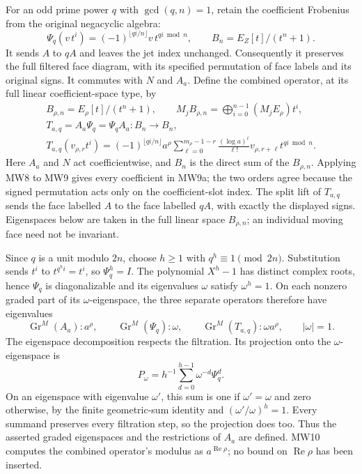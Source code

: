 For an odd prime power \(q\) with \(\gcd(q,n)=1\), retain the coefficient
Frobenius from the original negacyclic algebra:
\[
 \Psi_q(v\,t^i)
   =(-1)^{\lfloor qi/n\rfloor}v\,t^{qi\bmod n},
 \qquad B_n=E_Z[t]/(t^n+1).
 \tag{MW9}
\]
It sends \(A\) to \(qA\) and leaves the jet index unchanged.
Consequently it preserves the full filtered face diagram, with its
specified permutation of face labels and its original signs. It
commutes with \(N\) and \(A_a\). Define the combined operator, at its
full linear coefficient-space type, by
\[
 \begin{gathered}
 B_{\rho,n}=E_\rho[t]/(t^n+1),\qquad
 M_jB_{\rho,n}=\bigoplus_{i=0}^{n-1}(M_jE_\rho)t^i,\\
 T_{a,q}=A_a\Psi_q=\Psi_q A_a:B_n\longrightarrow B_n,\\
 T_{a,q}(v_{\rho,r}t^i)
 =(-1)^{\lfloor qi/n\rfloor}a^\rho
   \sum_{\ell=0}^{m_\rho-1-r}
      \frac{(\log a)^\ell}{\ell!}
      v_{\rho,r+\ell}t^{qi\bmod n}.
 \end{gathered}
 \tag{MW9a}
\]
Here \(A_a\) and \(N\) act coefficientwise, and \(B_n\) is the direct
sum of the \(B_{\rho,n}\). Applying MW8 to MW9 gives every coefficient
in MW9a; the two orders agree because the signed permutation acts only
on the coefficient-slot index. The split lift of \(T_{a,q}\) sends
the face labelled \(A\) to the face labelled \(qA\), with exactly
the displayed signs. Eigenspaces below are taken in the full linear
space \(B_{\rho,n}\); an individual moving face need not be invariant.

Since \(q\) is a unit modulo \(2n\), choose \(h\geq1\) with
\(q^h\equiv1\pmod {2n}\). Substitution sends \(t^i\) to
\(t^{q^hi}=t^i\), so \(\Psi_q^h=I\). The polynomial \(X^h-1\)
has distinct complex roots, hence \(\Psi_q\) is diagonalizable and
its eigenvalues \(\omega\) satisfy \(\omega^h=1\).
On each nonzero graded part of its \(\omega\)-eigenspace, the three
separate operators therefore have eigenvalues
\[
 \operatorname{Gr}^M(A_a):a^\rho,\qquad
 \operatorname{Gr}^M(\Psi_q):\omega,\qquad
 \operatorname{Gr}^M(T_{a,q}):\omega a^\rho,
 \qquad |\omega|=1 .
 \tag{MW10}
\]
The eigenspace decomposition respects the filtration. Its projection
onto the \(\omega\)-eigenspace is
\[
 P_\omega=h^{-1}\sum_{d=0}^{h-1}\omega^{-d}\Psi_q^d.
\]
On an eigenspace with eigenvalue \(\omega'\), this sum is one if
\(\omega'=\omega\) and zero otherwise, by the finite geometric-sum
identity and \((\omega'/\omega)^h=1\). Every summand preserves every
filtration step, so the projection does too. Thus the asserted
graded eigenspaces and the restrictions of
\(A_a\) are defined. MW10 computes the combined operator's modulus
as \(a^{\operatorname{Re}\rho}\); no bound
on \(\operatorname{Re}\rho\) has been inserted.

